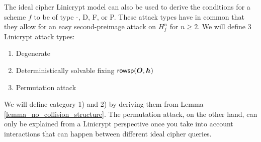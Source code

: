 The ideal cipher Linicrypt model can also be used to derive the conditions for a scheme $f$ to be of type -, D, F, or P. 
These attack types have in common that they allow for an easy second-preimage attack on $H^n_f$ for $n \geq 2$.
We will define 3 Linicrypt attack types:
\begin{enumerate}
\item Degenerate
\item Deterministically solvable fixing $\mathsf{rowsp}(\boldsymbol{O}, \boldsymbol h)$
\item Permutation attack
\end{enumerate}
We will define category 1) and 2) by deriving them from Lemma \ref{lemma_no_collision_structure}.
The permutation attack, on the other hand, can only be explained from a Linicrypt perspective
once you take into account interactions that can happen between different ideal cipher queries.

